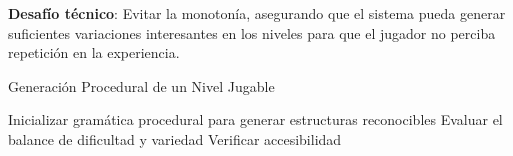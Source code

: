 \textbf{Desafío técnico}: Evitar la monotonía, asegurando que el sistema pueda generar suficientes variaciones interesantes en los niveles para que el jugador no perciba repetición en la experiencia.

\begin{algorithm}
\caption{Generación Procedural de un Nivel Jugable}
\SetAlgoLined

Inicializar gramática procedural para generar estructuras reconocibles\;
Evaluar el balance de dificultad y variedad\;
Verificar accesibilidad\;
\;
\end{algorithm}